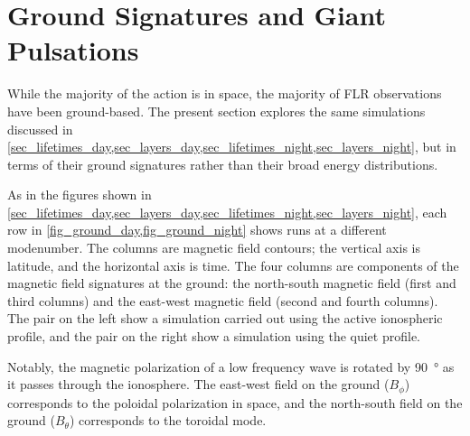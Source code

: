 
\section{Ground Signatures and Giant Pulsations}
  \label{sec_ground}

While the majority of the action is in space, the majority of FLR observations have been ground-based. The present section explores the same simulations discussed in \cref{sec_lifetimes_day,sec_layers_day,sec_lifetimes_night,sec_layers_night}, but in terms of their ground signatures rather than their broad energy distributions. 

As in the figures shown in \cref{sec_lifetimes_day,sec_layers_day,sec_lifetimes_night,sec_layers_night}, each row in \cref{fig_ground_day,fig_ground_night} shows runs at a different modenumber. The columns are magnetic field contours; the vertical axis is latitude, and the horizontal axis is time. The four columns are components of the magnetic field signatures at the ground:  the north-south magnetic field (first and third columns) and the east-west magnetic field (second and fourth columns). The pair on the left show a simulation carried out using the active ionospheric profile, and the pair on the right show a simulation using the quiet profile. 

Notably, the magnetic polarization of a low frequency \Alfven wave is rotated by \about\SI{90}{\degree} as it passes through the ionosphere\cite{hughes_1974}. The east-west field on the ground ($B_\phi$) corresponds to the poloidal polarization in space, and the north-south field on the ground ($B_\theta$) corresponds to the toroidal mode. 


